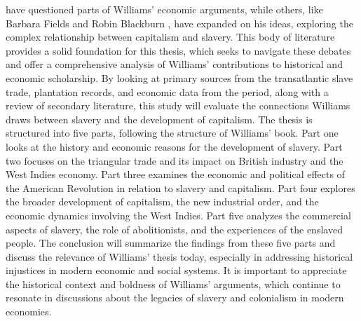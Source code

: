 have questioned parts of Williams' economic arguments, while others, like Barbara Fields  and Robin Blackburn , have expanded on his ideas, exploring the complex relationship between capitalism and slavery. This body of literature provides a solid foundation for this thesis, which seeks to navigate these debates and offer a comprehensive analysis of Williams' contributions to historical and economic scholarship. By looking at primary sources from the transatlantic slave trade, plantation records, and economic data from the period, along with a review of secondary literature, this study will evaluate the connections Williams draws between slavery and the development of capitalism. The thesis is structured into five parts, following the structure of Williams' book. Part one looks at the history and economic reasons for the development of slavery. Part two focuses on the triangular trade and its impact on British industry and the West Indies economy. Part three examines the economic and political effects of the American Revolution in relation to slavery and capitalism. Part four explores the broader development of capitalism, the new industrial order, and the economic dynamics involving the West Indies. Part five analyzes the commercial aspects of slavery, the role of abolitionists, and the experiences of the enslaved people. The conclusion will summarize the findings from these five parts and discuss the relevance of Williams' thesis today, especially in addressing historical injustices in modern economic and social systems. It is important to appreciate the historical context and boldness of Williams' arguments, which continue to resonate in discussions about the legacies of slavery and colonialism in modern economies.